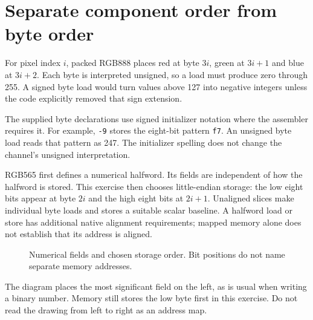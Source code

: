 \section{Separate component order from byte order}\label{rgb-encoding}
For pixel index $i$, packed RGB888 places red at byte $3i$, green at $3i+1$ and blue
at $3i+2$. Each byte is interpreted unsigned, so a load must produce zero through
255. A signed byte load would turn values above 127 into negative integers unless
the code explicitly removed that sign extension.

The supplied byte declarations use signed initializer notation where the assembler
requires it. For example, \texttt{-9} stores the eight-bit pattern \texttt{f7}.
An unsigned byte load reads that pattern as 247. The initializer spelling does not
change the channel's unsigned interpretation.

RGB565 first defines a numerical halfword. Its fields are independent of how the
halfword is stored. This exercise then chooses little-endian storage: the low eight
bits appear at byte $2i$ and the high eight bits at $2i+1$. Unaligned slices make
individual byte loads and stores a suitable scalar baseline. A halfword load or
store has additional native alignment requirements; mapped memory alone does not
establish that its address is aligned.

\begin{figure}[htbp]
  \centering
  \caption{Numerical fields and chosen storage order. Bit positions do not name separate memory addresses.}
\end{figure}

The diagram places the most significant field on the left, as is usual when writing
a binary number. Memory still stores the low byte first in this exercise. Do not
read the drawing from left to right as an address map.
